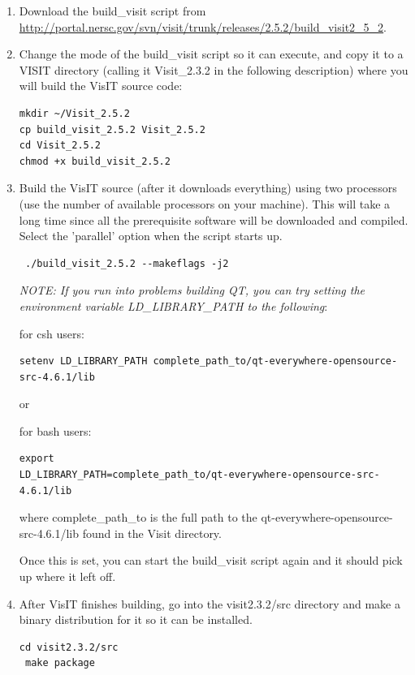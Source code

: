 \documentclass[12pt]{article}
\begin{document}
\begin{enumerate}
\item Download the build\_visit script from
  \url{http://portal.nersc.gov/svn/visit/trunk/releases/2.5.2/build_visit2_5_2}.



\item Change the mode of the build\_visit script so it can execute, and
  copy it to a VISIT directory (calling it Visit\_2.3.2 in the
  following description) where you will build the VisIT source code:
\begin{verbatim}
mkdir ~/Visit_2.5.2
cp build_visit_2.5.2 Visit_2.5.2
cd Visit_2.5.2
chmod +x build_visit_2.5.2
\end{verbatim}

\item Build the VisIT source (after it downloads everything) using two
  processors (use the number of available processors on your
  machine). This will take a long time since all the prerequisite
  software will be downloaded and compiled. Select the 'parallel'
  option when the script starts up. 

\begin{verbatim}
 ./build_visit_2.5.2 --makeflags -j2 
\end{verbatim}

\emph{NOTE: If you run into problems building QT, you can try setting
  the environment variable LD\_LIBRARY\_PATH to the following}:

for csh users:
\begin{verbatim}
setenv LD_LIBRARY_PATH complete_path_to/qt-everywhere-opensource-src-4.6.1/lib
\end{verbatim}

or

for bash users:
\begin{verbatim}
export
LD_LIBRARY_PATH=complete_path_to/qt-everywhere-opensource-src-4.6.1/lib
\end{verbatim}

where complete\_path\_to is the full path to the
qt-everywhere-opensource-src-4.6.1/lib found in the Visit directory.

Once this is set, you can start the build\_visit script again and it
should pick up where it left off.

\item After VisIT finishes building, go into the visit2.3.2/src
  directory and make a binary distribution for it so it can be
  installed.  
\begin{verbatim}
cd visit2.3.2/src
 make package 
\end{verbatim}


\end{enumerate}
\end{document}
